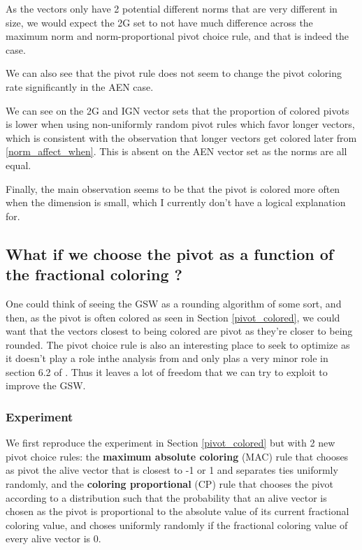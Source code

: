 \documentclass[12pt]{article}
\begin{document}
As the vectors only have 2 potential different norms that are very different in size, we would expect the 2G set to not have much difference across the maximum norm and norm-proportional pivot choice rule, and that is indeed the case.

We can also see that the pivot rule does not seem to change the pivot coloring rate significantly in the AEN case.

We can see on the 2G and IGN vector sets that the proportion of colored pivots is lower when using non-uniformly random pivot rules which favor longer vectors, which is consistent with the observation that longer vectors get colored later from \ref{norm_affect_when}. This is absent on the AEN vector set as the norms are all equal.

Finally, the main observation seems to be that the pivot is colored more often when the dimension is small, which I currently don't have a logical explanation for.

\subsection{What if we choose the pivot as a function of the fractional coloring ?}\label{pivot_coloring_rules}
One could think of seeing the GSW as a rounding algorithm of some sort, and then, as the pivot is often colored as seen in Section \ref{pivot_colored}, we could want that the vectors closest to being colored are pivot as they're closer to being rounded. The pivot choice rule is also an interesting place to seek to optimize as it doesn't play a role inthe analysis from \cite{blues} and only plas a very minor role in section 6.2 of \cite{harshaw2018balancing}. Thus it leaves a lot of freedom that we can try to exploit to improve the GSW.

\subsubsection{Experiment}\label{pivot_colored_coloring_rules}
We first reproduce the experiment in Section \ref{pivot_colored} but with 2 new pivot choice rules: the \textbf{maximum absolute coloring} (MAC) rule that chooses as pivot the alive vector that is closest to -1 or 1 and separates ties uniformly randomly, and the \textbf{coloring proportional} (CP) rule that chooses the pivot according to a distribution such that the probability that an alive vector is chosen as the pivot is proportional to the absolute value of its current fractional coloring value, and choses uniformly randomly if the fractional coloring value of every alive vector is 0.
\end{document}
